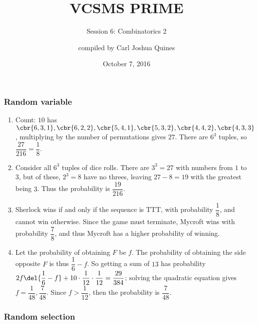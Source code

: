 \documentclass[10pt,paper=letter]{scrartcl}
\begin{document}
\title{VCSMS PRIME}
\subtitle{Session 6: Combinatorics 2}
\author{compiled by Carl Joshua Quines}
\date{October 7, 2016}

\maketitle

\subsubsection*{Random variable}

\begin{enumerate}

\item Count: $10$ has $\cbr{6, 3, 1}, \cbr{6, 2, 2}, \cbr{5, 4, 1}, \cbr{5, 3, 2}, \cbr{4, 4, 2}, \cbr{4, 3, 3}$, multiplying by the number of permutations gives $27$. There are $6^3$ tuples, so $\dfrac{27}{216} = \dfrac18$.

\item Consider all $6^3$ tuples of dice rolls. There are $3^3 = 27$ with numbers from $1$ to $3$, but of these, $2^3 = 8$ have no threes, leaving $27 - 8 = 19$ with the greatest being $3$. Thus the probability is $\dfrac{19}{216}$.

\item Sherlock wins if and only if the sequence is TTT, with probability $\dfrac18$, and cannot win otherwise. Since the game must terminate, Mycroft wins with probability $\dfrac78$, and thus Mycroft has a higher probability of winning.

\item Let the probability of obtaining $F$ be $f$. The probability of obtaining the side opposite $F$ is thus $\dfrac16 - f$. So getting a sum of $13$ has probability $2f\del{\dfrac16 - f} + 10\cdot\dfrac1{12}\cdot\dfrac1{12} = \dfrac{29}{384}$; solving the quadratic equation gives $f = \dfrac1{48}, \dfrac7{48}$. Since $f > \dfrac1{12}$, then the probability is $\dfrac7{48}$.

\end{enumerate}

\subsubsection*{Random selection}
\end{document}
